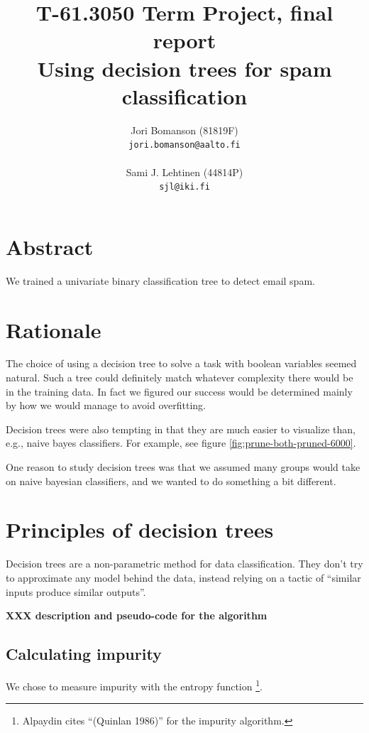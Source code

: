 \documentclass[a4paper,10pt]{article}
\title{T-61.3050 Term Project, final report\\ %
       Using decision trees for spam classification}
\author{Jori Bomanson (81819F) \\
  {\tt jori.bomanson@aalto.fi} \\
  \\
  Sami J. Lehtinen (44814P)\\ 
  {\tt sjl@iki.fi} \\
}
\newcommand{\XXX}[1]{{\bf XXX #1}}
\begin{document}

\maketitle
\thispagestyle{empty}
\pagebreak
{}

\section{Abstract}
We trained a univariate binary classification tree to detect email spam.


\section{Rationale}

The choice of using a decision tree to solve a task with boolean variables
seemed natural. Such a tree could definitely match whatever complexity there
would be in the training data.
In fact we figured our success would be determined mainly by how we would
manage to avoid overfitting.

Decision trees were also tempting in that they are much easier to
visualize than, e.g., naive bayes classifiers.  For example, see
figure \ref{fig:prune-both-pruned-6000}.

One reason to study decision trees was that we assumed many groups would
take on naive bayesian classifiers, and we wanted to do something a bit
different.

\section{Principles of decision trees}

Decision trees are a non-parametric method for data classification.
They don't try to approximate any model behind the data, instead relying
on a tactic of ``similar inputs produce similar outputs''.

\XXX{description and pseudo-code for the algorithm}

\subsection{Calculating impurity}

We chose to measure impurity with the entropy function
\cite[p. 176]{alpaydin2004}\footnote{Alpaydin cites ``(Quinlan 1986)''
  for the impurity algorithm.}.
\end{document}
